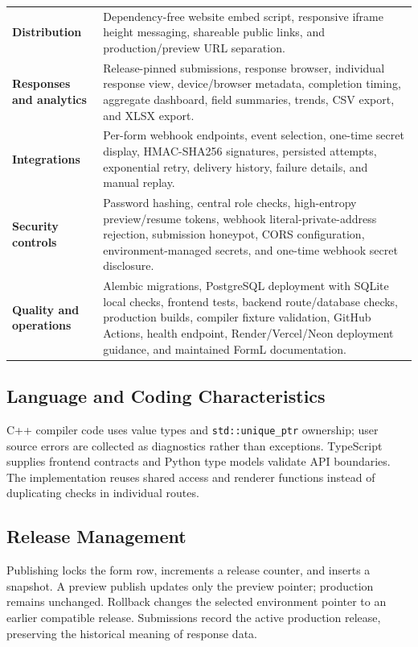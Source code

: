 \documentclass[12pt,a4paper,oneside]{report}
\begin{document}
\begin{longtable}{>{\bfseries}p{}p{}}
Distribution & Dependency-free website embed script, responsive iframe height messaging, shareable public links, and production/preview URL separation.\\
Responses and analytics & Release-pinned submissions, response browser, individual response view, device/browser metadata, completion timing, aggregate dashboard, field summaries, trends, CSV export, and XLSX export.\\
Integrations & Per-form webhook endpoints, event selection, one-time secret display, HMAC-SHA256 signatures, persisted attempts, exponential retry, delivery history, failure details, and manual replay.\\
Security controls & Password hashing, central role checks, high-entropy preview/resume tokens, webhook literal-private-address rejection, submission honeypot, CORS configuration, environment-managed secrets, and one-time webhook secret disclosure.\\
Quality and operations & Alembic migrations, PostgreSQL deployment with SQLite local checks, frontend tests, backend route/database checks, production builds, compiler fixture validation, GitHub Actions, health endpoint, Render/Vercel/Neon deployment guidance, and maintained FormL documentation.\\
\end{longtable}

\subsection{Language and Coding Characteristics}
C++ compiler code uses value types and \texttt{std::unique\_ptr} ownership; user source errors
are collected as diagnostics rather than exceptions. TypeScript supplies frontend contracts and
Python type models validate API boundaries. The implementation reuses shared access and renderer
functions instead of duplicating checks in individual routes.

\subsection{Release Management}
Publishing locks the form row, increments a release counter, and inserts a snapshot. A preview
publish updates only the preview pointer; production remains unchanged. Rollback changes the
selected environment pointer to an earlier compatible release. Submissions record the active
production release, preserving the historical meaning of response data.
\end{document}
